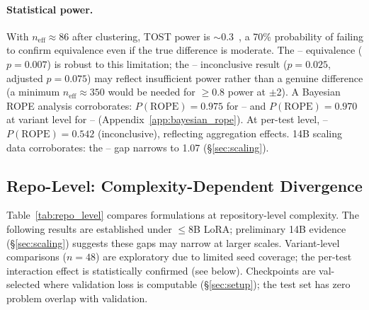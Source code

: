 \paragraph{Statistical power.} With $n_{\text{eff}} \approx 86$ after clustering, TOST power is ${\sim}$0.3~\cite{cohen1988}, a 70\% probability of failing to confirm equivalence even if the true difference is moderate. The \cls{}--\cwm{} equivalence ($p{=}0.007$) is robust to this limitation; the \cls{}--\traj{} inconclusive result ($p{=}0.025$, adjusted $p{=}0.075$) may reflect insufficient power rather than a genuine difference (a minimum $n_{\text{eff}} \approx 350$ would be needed for ${\geq}$0.8 power at $\pm$2\pp{}). A Bayesian ROPE analysis corroborates: $P(\text{ROPE}){=}0.975$ for \cls{}--\cwm{} and $P(\text{ROPE}){=}0.970$ at variant level for \cls{}--\traj{} (Appendix~\ref{app:bayesian_rope}). At per-test level, \cls{}--\traj{} $P(\text{ROPE}){=}0.542$ (inconclusive), reflecting aggregation effects. 14B scaling data corroborates: the \cls{}--\traj{} gap narrows to 1.07\pp{} (\S\ref{sec:scaling}).


\subsection{Repo-Level: Complexity-Dependent Divergence}
\label{sec:repo}

Table~\ref{tab:repo_level} compares formulations at repository-level complexity. The following results are established under ${\leq}$8B LoRA; preliminary 14B evidence (\S\ref{sec:scaling}) suggests these gaps may narrow at larger scales. Variant-level comparisons ($n{=}48$) are exploratory due to limited seed coverage; the per-test interaction effect is statistically confirmed (see below). Checkpoints are val-selected where validation loss is computable (\S\ref{sec:setup}); the test set has zero problem overlap with validation.

